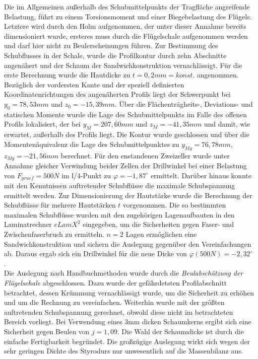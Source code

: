 \noindent Die im Allgemeinen außerhalb des Schubmittelpunkts der Tragfläche angreifende Belastung, führt zu einem Torsionsmoment und einer Biegebelastung des Flügels. Letztere wird durch den Holm aufgenommen, der unter dieser Annahme bereits dimensioniert wurde, ersteres muss durch die Flügelschale aufgenommen werden und darf hier nicht zu Beulerscheinungen führen. Zur Bestimmung des Schubflusses in der Schale, wurde die Profilkontur durch zehn Abschnitte angenähert und der Schaum der Sandwichkonstruktion vernachlässigt. Für die erste Berechnung wurde die Hautdicke zu $ t=0,2mm=konst. $ angenommen. Bezüglich der vordersten Kante und der speziell definierten Koordinatenrichtungen des angenäherten Profils liegt der Schwerpunkt bei $ y_{0}=78,53mm $ und $ z_{0}=-15,39mm $. Über die Flächenträgheits-, Deviations- und statischen Momente wurde die Lage des Schubmittelpunkts im Falle des offenen Profils lokalisiert, der bei $ y_{M}=207,60mm $ und $ z_{M}=-41,35mm $ und damit, wie erwartet, außerhalb des Profils liegt. Die Kontur wurde geschlossen und über die Momentenäquivalenz die Lage des Schubmittelpunktes zu $ y_{Mg}=76,78mm $, $ z_{Mg}=-21,56mm $ berechnet. Für den enstandenen Zweizeller wurde unter Annahme gleicher Verwindung beider Zellen der Drillwinkel bei einer Belastung von $ F_{pruef}=500N $ im l/4-Punkt zu $ \varphi=-1,87^{\circ} $ ermittelt. Darüber hinaus konnte mit den Kenntnissen auftretender Schubflüsse die maximale Schubspannung ermittelt werden. Zur Dimensionierung der Hautstärke wurde die Berechnung der Schubflüsse für mehrere Hautstärken $ t $ vorgenommen. Die so bestimmten maximalen Schubflüsse wurden mit den zugehörigen Lagenaufbauten in den Laminatrechner $ eLamX^{2} $ eingegeben, um die Sicherheiten gegen Faser- und Zwischenfaserbruch zu ermitteln. $ n=2 $ Lagen ermöglichen eine Sandwichkonstruktion und sichern die Auslegung gegenüber den Vereinfachungen ab. Daraus ergab sich ein Drillwinkel für die neue Dicke von $ \varphi(500N)=-2,32^{\circ} $.\\

\noindent Die Auslegung nach Handbuchmethoden wurde durch die \textit{Beulabschätzung der Flügelschale} abgeschlossen. Dazu wurde der gefährdetsten Profilabschnitt betrachtet, dessen Krümmung vernachlässigt wurde, um die Sicherheit zu erhöhen und um die Rechnung zu vereinfachen. Weiterhin wurde mit der größten auftretenden Schubspannung gerechnet, obwohl diese nicht im betrachteten Bereich vorliegt. Bei Verwendung eines 3mm dicken Schaumkerns ergibt sich eine Sicherheit gegen Beulen von $ j=1,09 $. Die Wahl der Schaumdicke ist durch die einfache Fertigbarkeit begründet. Die großzügige Auslegung wirkt sich wegen der sehr geringen Dichte des Styrodurs nur unwesentlich auf die Massenbilanz aus. 


